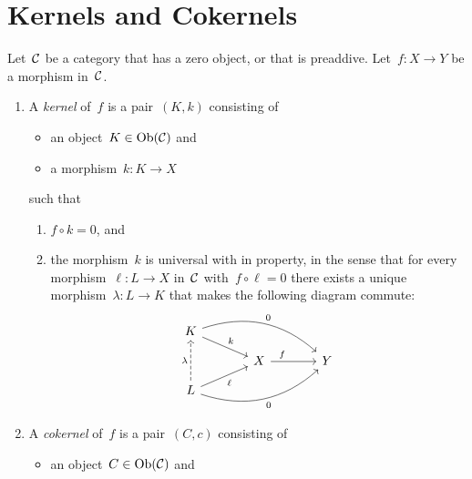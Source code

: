 \section{Kernels and Cokernels}


\begin{definition}
  Let~$\mathcal{C}$ be a category that has a zero object, or that is preaddive.
  Let~$f \colon X \to Y$ be a morphism in~$\mathcal{C}$.
  \begin{enumerate}
      \item
        A \emph{kernel} of~$f$ is a pair~$(K,k)$ consisting of
        \begin{itemize}
          \item
            an object~$K \in \operatorname{Ob}(\mathcal{C})$ and
          \item
            a morphism~$k \colon K \to X$
        \end{itemize}
        such that
        \begin{enumerate}[label = (K\arabic*)]
          \item
            $f \circ k = 0$, and
          \item
            the morphism~$k$ is universal with in property, in the sense that for every morphism~$\ell \colon L \to X$ in~$\mathcal{C}$ with~$f \circ \ell = 0$ there exists a unique morphism~$\lambda \colon L \to K$ that makes the following diagram commute:
            \[
              \begin{tikzcd}[row sep = small, column sep = large]
                  K
                  \arrow{dr}[above right]{k}
                  \arrow[bend left]{drr}[above right]{0}
                & {}
                & {}
                \\
                  {}
                & X
                  \arrow{r}[above, near start]{f}
                & Y
                \\
                  L
                  \arrow{ur}[below right]{\ell}
                  \arrow[bend right]{urr}[below right]{0}
                  \arrow[dashed]{uu}[left]{\lambda}
                & {}
                & {}
              \end{tikzcd}
            \]
        \end{enumerate}
      \item
        A \emph{cokernel} of~$f$ is a pair~$(C,c)$ consisting of
        \begin{itemize}
          \item
            an object~$C \in \operatorname{Ob}(\mathcal{C})$ and

\end{itemize}
\end{enumerate}
\end{definition}
